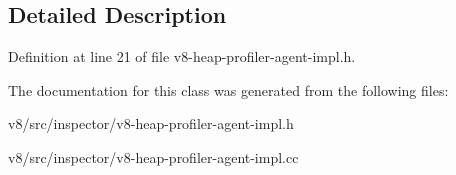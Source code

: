 \subsection{Detailed Description}


Definition at line 21 of file v8-\/heap-\/profiler-\/agent-\/impl.\+h.



The documentation for this class was generated from the following files\+:\begin{DoxyCompactItemize}
\item 
v8/src/inspector/v8-\/heap-\/profiler-\/agent-\/impl.\+h\item 
v8/src/inspector/v8-\/heap-\/profiler-\/agent-\/impl.\+cc\end{DoxyCompactItemize}
